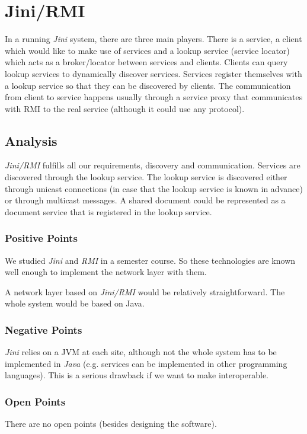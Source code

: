 \section{Jini/RMI}
In a running \emph{Jini} system, there are three main players. There is a service, a client which would like to make use of services and a lookup service (service locator) which acts as a broker/locator between services and clients. Clients can query lookup services to dynamically discover services. Services register themselves with a lookup service so that they can be discovered by clients. The communication from client to service happens usually through a service proxy that communicates with RMI to the real service (although it could use any protocol).



\subsection{Analysis}
\emph{Jini/RMI} fulfills all our requirements, discovery and communication. Services are discovered through the lookup service. The lookup service is discovered either through unicast connections (in case that the lookup service is known in advance) or through multicast messages. A shared document could be represented as a document service that is registered in the lookup service.

\subsubsection{Positive Points}
We studied \emph{Jini} and \emph{RMI} in a semester course. So these technologies are known well enough to implement the network layer with them.

A network layer based on \emph{Jini/RMI} would be relatively straightforward. The whole system would be based on Java.

\subsubsection{Negative Points}
\emph{Jini} relies on a JVM at each site, although not the whole system has to be implemented in \emph{Java} (e.g. services can be implemented in other programming languages). This is a serious drawback if we want to make \ace interoperable.

\subsubsection{Open Points}
There are no open points (besides designing the software).

